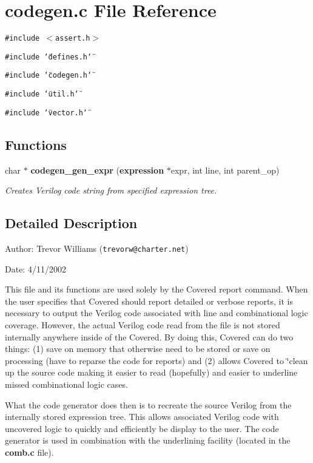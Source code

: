 \section{codegen.c File Reference}
\label{codegen_8c}
{\tt \#include $<$assert.h$>$}\par
{\tt \#include \char`\"{}defines.h\char`\"{}}\par
{\tt \#include \char`\"{}codegen.h\char`\"{}}\par
{\tt \#include \char`\"{}util.h\char`\"{}}\par
{\tt \#include \char`\"{}vector.h\char`\"{}}\par
\subsection*{Functions}
\begin{CompactItemize}
\item 
char $\ast$ {\bf codegen\_\-gen\_\-expr} ({\bf expression} $\ast$expr, int line, int parent\_\-op)
\begin{CompactList}\small\item\em Creates Verilog code string from specified expression tree.\item\end{CompactList}\end{CompactItemize}


\subsection{Detailed Description}
\begin{Desc}
\item[Author:]Trevor Williams ({\tt trevorw@charter.net}) \end{Desc}
\begin{Desc}
\item[Date:]4/11/2002\end{Desc}
\begin{Desc}
\item[]This file and its functions are used solely by the Covered report command. When the user specifies that Covered should report detailed or verbose reports, it is necessary to output the Verilog code associated with line and combinational logic coverage. However, the actual Verilog code read from the file is not stored internally anywhere inside of the Covered. By doing this, Covered can do two things: (1) save on memory that otherwise need to be stored or save on processing (have to reparse the code for reports) and (2) allows Covered to \char`\"{}clean up the source code making it easier to read (hopefully) and easier to underline missed combinational logic cases.\end{Desc}
\begin{Desc}
\item[]What the code generator does then is to recreate the source Verilog from the internally stored expression tree. This allows associated Verilog code with uncovered logic to quickly and efficiently be display to the user. The code generator is used in combination with the underlining facility (located in the {\bf comb.c} file).\end{Desc}


